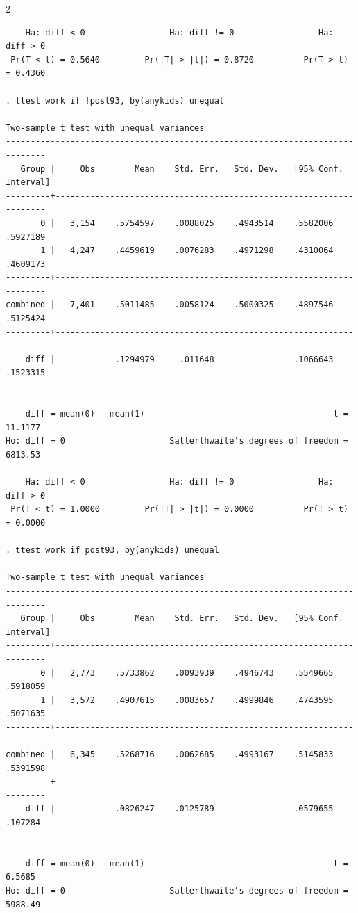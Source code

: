 \documentclass{article}
\newenvironment{changemargin}[2]{%
\begin{list}{}{%
\setlength{\topsep}{0pt}%
\setlength{\leftmargin}{#1}%
\setlength{\rightmargin}{#2}%
\setlength{\listparindent}{\parindent}%
\setlength{\itemindent}{\parindent}%
\setlength{\parsep}{\parskip}%
}%
\item[]}{\end{list}}
\begin{document}
\begin{changemargin}{-0.5in}{-0.5in}
\begin{multicols}{2}
\begin{verbatim}
    Ha: diff < 0                 Ha: diff != 0                 Ha: diff > 0
 Pr(T < t) = 0.5640         Pr(|T| > |t|) = 0.8720          Pr(T > t) = 0.4360

. ttest work if !post93, by(anykids) unequal

Two-sample t test with unequal variances
------------------------------------------------------------------------------
   Group |     Obs        Mean    Std. Err.   Std. Dev.   [95% Conf. Interval]
---------+--------------------------------------------------------------------
       0 |   3,154    .5754597    .0088025    .4943514    .5582006    .5927189
       1 |   4,247    .4459619    .0076283    .4971298    .4310064    .4609173
---------+--------------------------------------------------------------------
combined |   7,401    .5011485    .0058124    .5000325    .4897546    .5125424
---------+--------------------------------------------------------------------
    diff |            .1294979     .011648                .1066643    .1523315
------------------------------------------------------------------------------
    diff = mean(0) - mean(1)                                      t =  11.1177
Ho: diff = 0                     Satterthwaite's degrees of freedom =  6813.53

    Ha: diff < 0                 Ha: diff != 0                 Ha: diff > 0
 Pr(T < t) = 1.0000         Pr(|T| > |t|) = 0.0000          Pr(T > t) = 0.0000

. ttest work if post93, by(anykids) unequal

Two-sample t test with unequal variances
------------------------------------------------------------------------------
   Group |     Obs        Mean    Std. Err.   Std. Dev.   [95% Conf. Interval]
---------+--------------------------------------------------------------------
       0 |   2,773    .5733862    .0093939    .4946743    .5549665    .5918059
       1 |   3,572    .4907615    .0083657    .4999846    .4743595    .5071635
---------+--------------------------------------------------------------------
combined |   6,345    .5268716    .0062685    .4993167    .5145833    .5391598
---------+--------------------------------------------------------------------
    diff |            .0826247    .0125789                .0579655     .107284
------------------------------------------------------------------------------
    diff = mean(0) - mean(1)                                      t =   6.5685
Ho: diff = 0                     Satterthwaite's degrees of freedom =  5988.49


\end{verbatim}
\end{multicols}
\end{changemargin}
\end{document}
